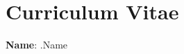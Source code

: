 \documentclass{article}
\begin{document}
    \section*{Curriculum Vitae}

    \textbf{Name}: {{ .Name }}
\end{document}
